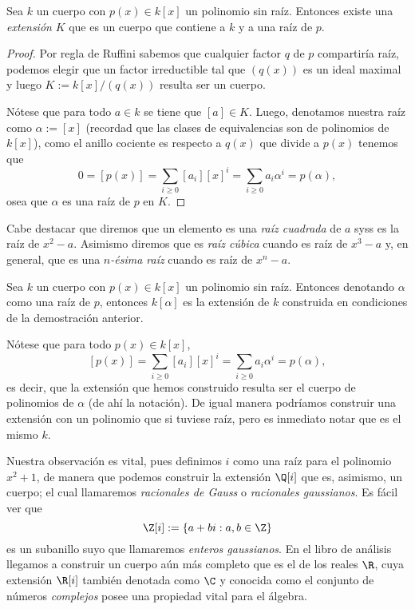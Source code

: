 \documentclass[11pt,oneside]{book}
\begin{document}
\begin{thm}
Sea $k$ un cuerpo con $p(x)\in k[x]$ un polinomio sin raíz. Entonces existe una \textit{extensión} $K$ que es un cuerpo que contiene a $k$ y a una raíz de $p$.
\end{thm}
\begin{proof}
Por regla de Ruffini sabemos que cualquier factor $q$ de $p$ compartiría raíz, podemos elegir que un factor irreductible tal que $(q(x))$ es un ideal maximal y luego $K:=k[x]/(q(x))$ resulta ser un cuerpo.

Nótese que para todo $a\in k$ se tiene que $[a]\in K$. Luego, denotamos nuestra raíz como $\alpha:=[x]$ (recordad que las clases de equivalencias son de polinomios de $k[x]$), como el anillo cociente es respecto a $q(x)$ que divide a $p(x)$ tenemos que
$$0=[p(x)]=\sum_{i\geq 0}[a_i][x]^i=\sum_{i\geq 0}a_i\alpha^i=p(\alpha),$$
osea que $\alpha$ es una raíz de $p$ en $K$.
\end{proof}
Cabe destacar que diremos que un elemento es una \textit{raíz cuadrada} de $a$ syss es la raíz de $x^2-a$. Asimismo diremos que es \textit{raíz cúbica} cuando es raíz de $x^3-a$ y, en general, que es una \textit{$n$-ésima raíz} cuando es raíz de $x^n-a$.
\begin{mydef}
Sea $k$ un cuerpo con $p(x)\in k[x]$ un polinomio sin raíz. Entonces denotando $\alpha$ como una raíz de $p$, entonces $k[\alpha]$ es la extensión de $k$ construida en condiciones de la demostración anterior.
\end{mydef}
Nótese que para todo $p(x)\in k[x]$,
$$[p(x)]=\sum_{i\geq 0}[a_i][x]^i=\sum_{i\geq 0}a_i\alpha^i=p(\alpha),$$
es decir, que la extensión que hemos construido resulta ser el cuerpo de polinomios de $\alpha$ (de ahí la notación). De igual manera podríamos construir una extensión con un polinomio que si tuviese raíz, pero es inmediato notar que es el mismo $k$.

Nuestra observación es vital, pues definimos $i$ como una raíz para el polinomio $x^2+1$, de manera que podemos construir la extensión $\Q[i]$ que es, asimismo, un cuerpo; el cual llamaremos \textit{racionales de Gauss} o \textit{racionales gaussianos}. Es fácil ver que
$$\Z[i]:=\{a+bi:a,b\in\Z\}$$
es un subanillo suyo que llamaremos \textit{enteros gaussianos}. En el libro de análisis llegamos a construir un cuerpo aún más completo que es el de los reales $\R$, cuya extensión $\R[i]$ también denotada como $\C$  y conocida como el conjunto de números \textit{complejos} posee una propiedad vital para el álgebra.
\end{document}
